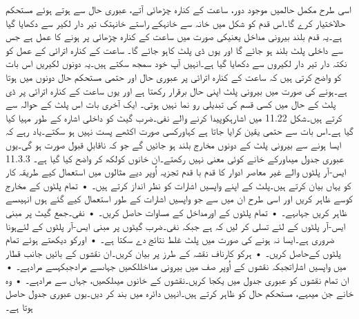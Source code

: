 		اسی طرح مکمل حالمیں موجود دور، ساعت کے کنارہ چڑھائی آتے، عبوری حال سے ہوتے ہوئے مستحکم حالاختیار کرے گا۔اس قدم کو شکل میں خانہ سے  خانہکے راستے خانہتک تیر دار  لکیر سے دکھایا گیا ہے۔یہ قدم بلند بیرونی مداخل یعنیکی صورت میں ساعت کے کنارہ چڑھائی پر ہونے کا عمل ہے جس سے داخلی پلٹ بلند ہو جائے گا اور یوں ڈی پلٹ کاہو جائے گا۔
	ساعت کے کنارہ اترائی کے عمل کو نکتہ دار تیر دار  لکیروں سے دکھایا گیا ہے۔انہیں آپ خود سمجھ سکتے ہیں۔یہ دونوں لکیریں اس بات کو واضح کرتی ہیں کہ ساعت کے کنارہ اترائی پر عبوری حال  اور حتمی مستحکم حال دونوں میں ہوتا ہے۔ہونے کی صورت میں بیرونی پلٹ اپنی حال برقرار رکھتا ہے اور یوں ساعت کے کنارہ اترائی پر ڈی پلٹ کے حال میں کسی قسم کی تبدیلی رو نما نہیں ہوتی۔
	ایک آخری بات اس پلٹ کے حوالہ سے کرتے ہیں۔شکل 11.22 میں اشارہکوپیدا کرنے والے نفی۔ضرب گیٹ کو داخلی اشارہ کے طور مہیا کیا گیا ہے۔اس بات سے حتمی یقین کرایا جاتا ہے کہاورکسی صورت اکٹھے پست نہیں ہو سکتے۔یاد رہے کہ ایسا ہونے سے بیرونی پلٹ کے دونوں مخارج بلند ہو جائیں گے جو کہ ناقابلِ قبول صورت ہو گی۔یوں عبوری جدول میںاورکے خانے کوئی معنی نہیں رکھتے۔ان خانوں کولکھ کر واضح کیا گیا ہے۔
11.3.3 ایس-آر پلٹوں والے غیر معاصر ادوار کا قدم با قدم تجزیہ
	اُوپر دیے مثالوں میں استعمال کیے طریقہ کار کو یہاں بیان کرتے ہیں۔پلٹ کے اپنے واپسیں اشارات کو نظر انداز کرتے ہیں۔
    • تمام پلٹوں کے مخارج کوسے ظاہر کریں اور اسی طرح ان میں سے جو واپسیں اشارات کے طور استعمال کیے گئے ہوں انہیںسے ظاہر کریں جہاںہے۔
    • تمام پلٹوں کے اورمداخل کے مساوات حاصل کریں۔
    • نفی۔جمع گیٹ پر مبنی ایس-آر پلٹوں کے لئے تسلی کر لیں کہ ہے جبکہ نفی۔ضرب گیٹوں پر مبنی ایس-آر پلٹوں کے لئےہونا ضروری ہے۔ایسا نہ ہونے کی صورت میں پلٹ غلط نتائج دے سکتا ہے۔
    • اورکو دیکھتے ہوئے تمام پلٹوں کےحاصل کریں۔
    • ہرکو کارناف نقشہ کے طرز پر بیان کریں۔ان نقشوں کے بائیں جانب قطار میں واپسیں اشاراتجبکہ نقشوں کے اُوپر صف میں بیرونی مداخللکھیں جہاںسے مرادجبکہسے مرادہے۔
    • ان تمام نقشوں کو عبوری جدول میں یکجا کریں۔نقشوں کے خانوں میںلکھیں، جہاں سے مرادہے۔
    • وہ خانے جن میںہے، مستحکم حال کو ظاہر کرتے ہیں۔انہیں دائرہ میں بند کر دیں۔یوں عبوری جدول حاصل ہوتا ہے۔


